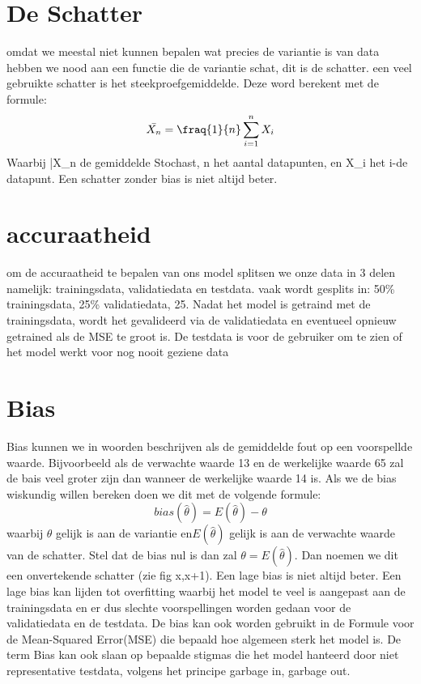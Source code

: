\documentclass[TeamE-eindrapport]{subfiles}
\begin{document}
	
	\section{De Schatter}
	omdat we meestal niet kunnen bepalen wat precies de variantie is van data hebben we nood aan een functie die de variantie schat, dit is de schatter.
	een veel gebruikte schatter is het steekproefgemiddelde. Deze word berekent met de formule:
	\begin{equation}
		\bar{X_n} = \fraq{1}{n} \sum_{i=1}^{n} X_i
	\end{equation}
	Waarbij \bar{X_n} de gemiddelde Stochast, n het aantal datapunten, en X_i het i-de datapunt. 
	Een schatter zonder bias is niet altijd beter. 
	
	
	
	\section{accuraatheid}
	om de accuraatheid te bepalen van ons model splitsen we onze data in 3 delen namelijk: trainingsdata, validatiedata en testdata.
	vaak wordt gesplits in: 50\% trainingsdata, 25\% validatiedata, 25\testdata. Nadat het model is getraind met de trainingsdata, wordt het
	gevalideerd via de validatiedata en eventueel opnieuw getrained als de MSE te groot is. De testdata is voor de gebruiker om te zien of het model werkt
	voor nog nooit geziene data
	
	\section{Bias}
	Bias kunnen we in woorden beschrijven als de gemiddelde fout op een voorspellde waarde. Bijvoorbeeld als de
	verwachte waarde 13 en de werkelijke waarde 65 zal de bais veel groter zijn dan wanneer de werkelijke waarde 14 is.
	Als we de bias wiskundig willen bereken doen we dit met de volgende formule:
	\begin{equation}
		bias( \hat{\theta}) = E( \hat{\theta}) − \theta
	\end{equation}
	waarbij \(\theta\) gelijk is aan de variantie en\( E( \hat{\theta})\) gelijk is aan de verwachte waarde van de schatter.
	Stel dat de bias nul is dan zal \(\theta = E( \hat{\theta})\). 
	Dan noemen we dit een onvertekende schatter (zie fig x,x+1). Een lage bias is niet altijd beter.
	Een lage bias kan lijden tot overfitting waarbij het model te veel is aangepast
	aan de trainingsdata en er dus slechte voorspellingen worden gedaan voor de validatiedata en de testdata. De bias kan
	ook worden gebruikt in de Formule voor de Mean-Squared Error(MSE) die bepaald hoe algemeen sterk het model is. De term Bias kan ook slaan op
	bepaalde stigmas die het model hanteerd door niet representative testdata, volgens het principe garbage in, garbage out. 
	
\end{document}
